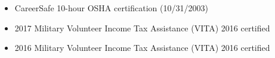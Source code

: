 \begin{itemize}
    \item CareerSafe 10-hour OSHA certification (10/31/2003)
    \item 2017 Military Volunteer Income Tax Assistance (VITA) 2016 certified
    \item 2016 Military Volunteer Income Tax Assistance (VITA) 2016 certified
\end{itemize}